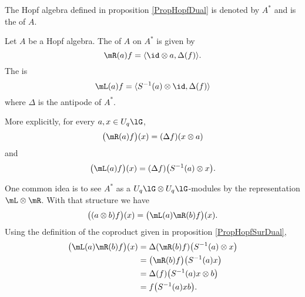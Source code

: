 The Hopf algebra defined in proposition \ref{PropHopfDual} is denoted by \( A^*\) and is the  of \( A\).

\begin{definition}
    Let \( A\) be a Hopf algebra. The  of \( A\) on \( A^*\) is given by
    \begin{equation}        \label{EqDefregularLEftHopf}
        \mR(a)f=\langle \id\otimes a, \Delta(f)\rangle .
    \end{equation}
    The  is 
    \begin{equation}
        \mL(a)f=\langle S^{-1}(a)\otimes \id, \Delta(f)\rangle 
    \end{equation}
    where \( \Delta\) is the antipode of \( A^*\).
\end{definition}
More explicitly, for every \( a,x\in U_q\lG\),
\begin{equation}
    \big( \mR(a)f \big)(x)=(\Delta f)(x\otimes a)
\end{equation}
and
\begin{equation}
    \big( \mL(a)f \big)(x)=(\Delta f)\big( S^{-1}(a)\otimes x \big).
\end{equation}

One common idea is to see \( A^*\) as a \( U_q\lG\otimes U_q\lG\)-modules by the representation \( \mL\otimes\mR\). With that structure we have
\begin{equation}        \label{EqmRmLAAsurAstar}
    \big( (a\otimes b)f \big)(x)=\big( \mL(a)\mR(b)f \big)(x).
\end{equation}
Using the definition of the coproduct given in proposition \ref{PropHopfSurDual},
\begin{equation}        \label{EqmRmLabf}
    \begin{aligned}[]
        \big( \mL(a)\mR(b)f \big)(x)&=\Delta(\mR(b)f)\big( S^{-1}(a)\otimes x \big)\\
        &=\big( \mR(b)f \big)\big( S^{-1}(a)x \big)\\
        &=\Delta(f)\big( S^{-1}(a)x\otimes b \big)\\
        &=f\big( S^{-1}(a)xb \big).
    \end{aligned}
\end{equation}

